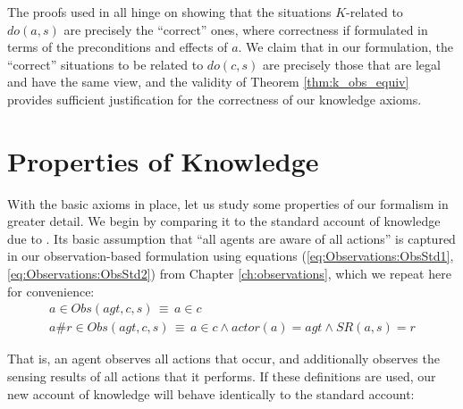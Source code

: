 The proofs used in \citep{scherl03sc_knowledge} all hinge on showing
that the situations $K$-related to $do(a,s)$ are precisely the {}``correct''
ones, where correctness if formulated in terms of the preconditions
and effects of $a$. We claim that in our formulation, the {}``correct''
situations to be related to $do(c,s)$ are precisely those that are
legal and have the same view, and the validity of Theorem \ref{thm:k_obs_equiv}
provides sufficient justification for the correctness of our knowledge
axioms.\newpage{}


\section{Properties of Knowledge\label{sec:Knowledge:Properties}}

With the basic axioms in place, let us study some properties of our
formalism in greater detail. We begin by comparing it to the standard
account of knowledge due to \citet{scherl03sc_knowledge}. Its basic
assumption that {}``all agents are aware of all actions'' is captured
in our observation-based formulation using equations (\ref{eq:Observations:ObsStd1},\ref{eq:Observations:ObsStd2})
from Chapter \ref{ch:observations}, which we repeat here for convenience:\begin{gather*}
a\in Obs(agt,c,s)\,\equiv\, a\in c\\
a\#r\in Obs(agt,c,s)\,\equiv\, a\in c\wedge actor(a)=agt\wedge SR(a,s)=r\end{gather*}


That is, an agent observes all actions that occur, and additionally
observes the sensing results of all actions that it performs. If these
definitions are used, our new account of knowledge will behave identically
to the standard account:

